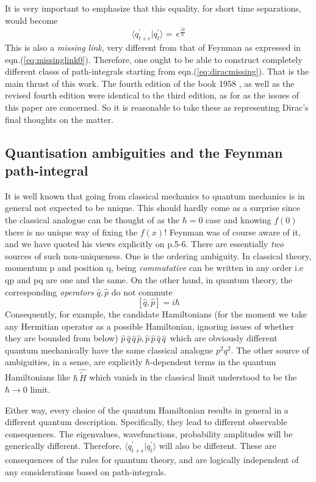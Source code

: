 \documentclass[12pt]{article}
\newcommand{\be}{\begin{equation}}
\newcommand{\ee}{\end{equation}}
\begin{document}
It is very important to emphasize that this equality, for short time separations, would become
\be
\label{eq:diracmissing}
\langle q^\prime_{t+\epsilon}|q^{\prime}_t\rangle 
=\,e^{\frac{i {\tilde S}}{\hbar}}
\ee
This is also a \emph{missing link}, very different from that of Feynman as expressed in eqn.(\ref{eq:missinglink0}). Therefore, one ought
to be able to construct completely different classs of path-integrals starting from eqn.(\ref{eq:diracmissing}). That is the main thrust
of this work.
The fourth edition of the
book 1958 \cite{diracbook4}, as well as the revised fourth edition \cite{diracbook4r} were identical to the third edition, as for as the
issues of this paper are concerned. So it is reasonable to take these as representing Dirac's final thoughts on the matter.

\subsection{Quantisation ambiguities and the Feynman path-integral}
It is well known that going from classical mechanics to quantum mechanics is in general not expected to be unique. This should hardly come as a
surprise since the classical analogue can be thought of as the $\hbar = 0$ case and knowing  $f(0)$ there is no unique way of fixing
the $f(x)$! Feynman was of course aware of it, and we have quoted his views explicitly on p.5-6. There are essentially \emph{two} sources
of such non-uniqueness. One 
is the ordering ambiguity. In classical theory, momentum p and position q, being {\it commutative} can be written in any
order i.e qp and pq are one and the same. On the other hand, in quantum theory, the corresponding {\it operators} ${\hat q}, {\hat p}$
do not commute
\be
\label{eq:heisenbergalgebra}
[{\hat q}, {\hat p}] = i\hbar
\ee
Consequently, for example, the candidate Hamiltonians (for the moment we take any Hermitian operator as a possible Hamiltonian, ignoring
issues of whether they are bounded from below) ${\hat p}\,{\hat q}\,{\hat q}\,{\hat p}, {\hat p}\,{\hat p}\,{\hat q}\,{\hat q}\,$ which are 
obviously different quantum mechanically have the same classical analogue $p^2q^2$.  The other source of ambiguities, in a sense, are 
explicitly $\hbar$-dependent terms in the quantum Hamiltonians like $\hbar\,{\hat{\tilde H}}$
which vanish in the classical limit understood to be the $\hbar \rightarrow 0$ limit. 

Either way, every choice of the quantum Hamiltonian results in general in a different
quantum description. Specifically, they lead to different observable consequences. The eigenvalues, wavefunctions, probability amplitudes
will be generically different. Therefore, $\langle q_{t+\epsilon}^\prime|q_t^\prime\rangle$ will also be different. These are consequences
of the rules for quantum theory, and are logically independent of any considerations based on path-integrals. 
\end{document}
